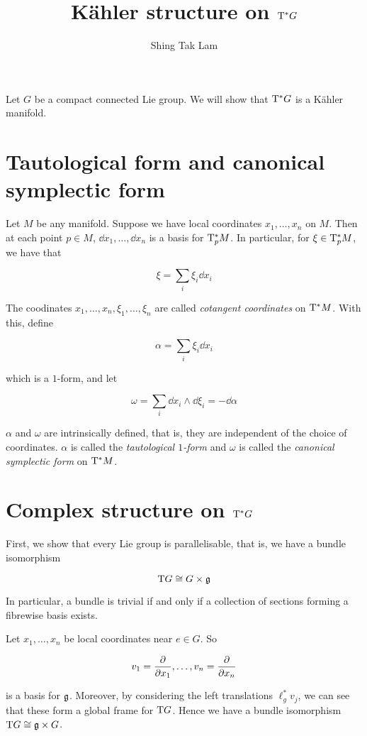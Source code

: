 \documentclass{article}
\title{K\"ahler structure on \(\mathrm{T}^* G\)}
\author{Shing Tak Lam}
\begin{document}
\maketitle

Let \(G\) be a compact connected Lie group. We will show that \(\mathrm{T}^*G\) is a K\"ahler manifold.

\section{Tautological form and canonical symplectic form}

Let \(M\) be any manifold. Suppose we have local coordinates \(x_1, \dots, x_n\) on \(M\). Then at each point \(p \in M\), \(\dd x_1, \dots, \dd x_n\) is a basis for \(\mathrm{T}_p^*M\). In particular, for \(\xi \in \mathrm{T}_p^* M\), we have that

\[\xi = \sum_i \xi_i \dd x_i\]

The coodinates \(x_1, \dots, x_n, \xi_1, \dots, \xi_n\) are called \emph{cotangent coordinates} on \(\mathrm{T}^*M\). With this, define

\[\alpha = \sum_i \xi_i \dd x_i\]

which is a \(1\)-form, and let

\[\omega = \sum_i \dd x_i \wedge \dd \xi_i = -\dd\alpha\]

\(\alpha\) and \(\omega\) are intrinsically defined, that is, they are independent of the choice of coordinates. \(\alpha\) is called the \emph{tautological \(1\)-form} and \(\omega\) is called the \emph{canonical symplectic form} on \(\mathrm{T}^*M\).

\section{Complex structure on \(\mathrm{T}^*G\)}

First, we show that every Lie group is parallelisable, that is, we have a bundle isomorphism

\[\mathrm{T} G \cong G \times \mathfrak{g}\]

In particular, a bundle is trivial if and only if a collection of sections forming a fibrewise basis exists.

Let \(x_1, \dots, x_n\) be local coordinates near \(e \in G\). So

\[v_1 = \pdv{x_1}, \dots, v_n = \pdv{x_n}\]

is a basis for \(\mathfrak{g}\). Moreover, by considering the left translations \(\ell_g^*v_j\), we can see that these form a global frame for \(\mathrm{T} G\). Hence we have a bundle isomorphism \(\mathrm{T} G \cong \mathfrak{g} \times G\).
\end{document}
